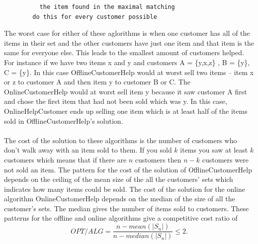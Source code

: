 \documentclass[12pt]{article}
\begin{document}
\begin{enumerate}
\begin{enumerate}
\begin{verbatim}
          the item found in the maximal matching
        do this for every customer possible
      \end{verbatim}
      The worst case for either of these aglorithms is when one customer has all
      of the items in their set and the other customers have just one item and that
      item is the same for everyone else.  This leads to the smallest amount of
      customers helped.  For instance if we have two items x and y and customers
      A = \{y,x,z\} , B = \{y\}, C = \{y\}.
      In this case OfflineCustomerHelp would at worst sell two items -- item x
      or z to customer A and then item y to customer B or C.  The
      OnlineCustomerHelp would at worst sell item y because it saw customer
      A first and chose the first item that had not been sold which was y.
      In this case, OnlineHelpCustomer ends up selling one item which is at
      least half of the items sold in OfflineCustomerHelp's solution.\\
      \\
      The cost of the solution to these algorithms is the number of customers
      who don't walk away with an item sold to them.  If you sold $k$ items you
      saw at least $k$ customers which means that if there are $n$ customers
      then $n-k$ customers were not sold an item.
      The pattern for the cost of the solution of OfflineCustomerHelp depends on
      the ceiling of the mean size of the all the customers' sets which indicates
      how many items could be sold.
      The cost of the solution for the online algorithm OnlineCustomerHelp
      depends on the median of the size of all the customer's sets.  The median
      gives the number of items sold to customers.  These patterns for the
      offline and online algorithms give a competitive cost ratio of $$
      OPT/ALG = \frac{n-mean(|S_n|)}{n-median(|S_n|)}
      \le 2.
      $$


\end{enumerate}
\end{enumerate}
\end{document}
